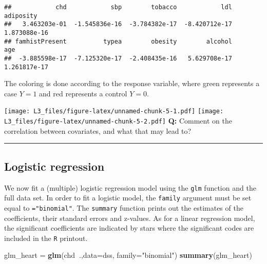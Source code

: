 \documentclass[
]{article}
\newenvironment{Shaded}{\begin{snugshade}}{\end{snugshade}}
\newcommand{\DataTypeTok}[1]{\textcolor[rgb]{0.13,0.29,0.53}{#1}}
\newcommand{\KeywordTok}[1]{\textcolor[rgb]{0.13,0.29,0.53}{\textbf{#1}}}
\newcommand{\NormalTok}[1]{#1}
\newcommand{\OperatorTok}[1]{\textcolor[rgb]{0.81,0.36,0.00}{\textbf{#1}}}
\newcommand{\StringTok}[1]{\textcolor[rgb]{0.31,0.60,0.02}{#1}}
\begin{document}
\begin{verbatim}
##            chd            sbp        tobacco            ldl      adiposity 
##   3.463203e-01  -1.545836e-16  -3.784382e-17  -8.420712e-17   1.873088e-16 
## famhistPresent          typea        obesity        alcohol            age 
##  -3.885598e-17  -7.125320e-17  -2.408435e-16   5.629708e-17   1.261817e-17
\end{verbatim}

The coloring is done according to the response variable, where green
represents a case \(Y=1\) and red represents a control \(Y=0\).

\texttt{[image: L3\_files/figure-latex/unnamed-chunk-5-1.pdf]}
\texttt{[image: L3\_files/figure-latex/unnamed-chunk-5-2.pdf]}
\textbf{Q:} Comment on the correlation between covariates, and what that
may lead to?

\begin{center}\rule{0.5\linewidth}{0.5pt}\end{center}

\hypertarget{logistic-regression}{%
\subsection{Logistic regression}\label{logistic-regression}}

We now fit a (multiple) logistic regression model using the \texttt{glm}
function and the full data set. In order to fit a logistic model, the
\texttt{family} argument must be set equal to \texttt{="binomial"}. The
\texttt{summary} function prints out the estimates of the coefficients,
their standard errors and z-values. As for a linear regression model,
the significant coefficients are indicated by stars where the
significant codes are included in the \texttt{R} printout.

\begin{Shaded}
\begin{Highlighting}[]
\NormalTok{glm_heart =}\StringTok{ }\KeywordTok{glm}\NormalTok{(chd}\OperatorTok{~}\NormalTok{.,}\DataTypeTok{data=}\NormalTok{dss, }\DataTypeTok{family=}\StringTok{"binomial"}\NormalTok{)}
\KeywordTok{summary}\NormalTok{(glm_heart)}
\end{Highlighting}
\end{Shaded}
\end{document}
